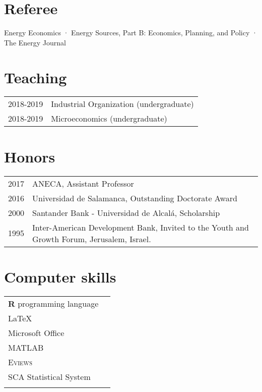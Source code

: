 \documentclass[11pt]{article}\usepackage[]{graphicx}\usepackage[]{color}
\begin{document}
\section{Referee} 

\raggedright
Energy Economics · Energy Sources, Part B: Economics, Planning, and Policy · The Energy Journal


\section{Teaching} 

\begin{tabular}{R{2cm} | L{12cm}}

2018-2019 & Industrial Organization (undergraduate)\\

2018-2019 & Microeconomics (undergraduate)\\

\end{tabular}


\section{Honors} 

\begin{tabular}{R{2cm} | L{12cm}}

2017 & ANECA, Assistant Professor\\

2016 & Universidad de Salamanca, Outstanding Doctorate Award\\

2000	& Santander Bank - Universidad de Alcalá, Scholarship\\

1995 & Inter-American Development Bank, Invited to the Youth and Growth Forum, Jerusalem, Israel.\\

\end{tabular}


\section{Computer skills} 

\begin{tabular}{ll}
\textbf{\textsf{R}} programming language\\
{\LaTeX}\\
Microsoft Office\\
\textsc{MATLAB}\\
\textsc{Eviews}\\
SCA Statistical System\\
&
\end{tabular}
\end{document}
